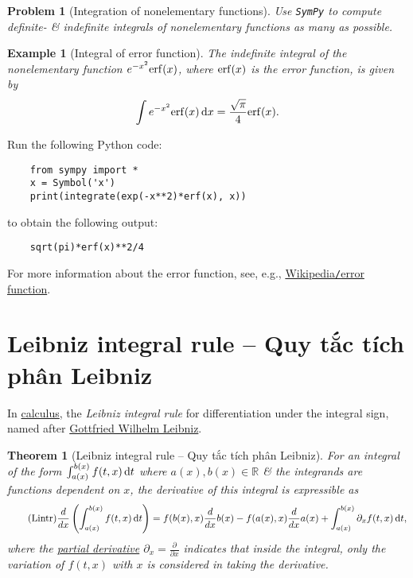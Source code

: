 \documentclass[oneside]{book}
\newtheorem{example}{Example}
\newtheorem{problem}{Problem}
\newtheorem{theorem}{Theorem}
\begin{document}
\begin{problem}[Integration of nonelementary functions]
	Use {\tt SymPy} to compute definite- \& indefinite integrals of nonelementary functions as many as possible.
\end{problem}

\begin{example}[Integral of error function]
	The indefinite integral of the nonelementary function $e^{-x^2}{\rm erf}(x)$, where ${\rm erf}(x)$ is the {\rm error function}, is given by
	\begin{equation*}
		\int e^{-x^2}{\rm erf}(x)\,{\rm d}x = \frac{\sqrt{\pi}}{4}{\rm erf}(x).
	\end{equation*}
\end{example}
Run the following Python code:
\begin{verbatim}
	from sympy import *
	x = Symbol('x')
	print(integrate(exp(-x**2)*erf(x), x))
\end{verbatim}
to obtain the following output:
\begin{verbatim}
	sqrt(pi)*erf(x)**2/4
\end{verbatim}
For more information about the error function, see, e.g., \href{https://en.wikipedia.org/wiki/Error_function}{Wikipedia{\tt/}error function}.


\section{Leibniz integral rule -- Quy tắc tích phân Leibniz}
In \href{https://en.wikipedia.org/wiki/Calculus}{calculus}, the {\it Leibniz integral rule} for differentiation under the integral sign, named after \href{https://en.wikipedia.org/wiki/Gottfried_Wilhelm_Leibniz}{\sc Gottfried Wilhelm Leibniz}.

\begin{theorem}[Leibniz integral rule -- Quy tắc tích phân Leibniz]
	For an integral of the form $\int_{a(x)}^{b(x)} f(t,x)\,{\rm d}t$ where $a(x),b(x)\in\mathbb{R}$ \& the integrands are functions dependent on $x$, the derivative of this integral is expressible as
	\begin{equation}
		\label{Leibniz integral rule}
		\tag{Lintr}
		\frac{d}{dx}\left(\int_{a(x)}^{b(x)} f(t,x)\,{\rm d}t\right) = f(b(x),x)\frac{d}{dx}b(x) - f(a(x),x)\frac{d}{dx}a(x) + \int_{a(x)}^{b(x)} \partial_xf(t,x)\,{\rm d}t,
	\end{equation}
	where the \href{https://en.wikipedia.org/wiki/Partial_derivative}{partial derivative} $\partial_x = \frac{\partial}{\partial x}$ indicates that inside the integral, only the variation of $f(t,x)$ with $x$ is considered in taking the derivative.
\end{theorem}
\end{document}

